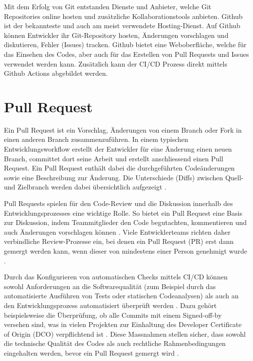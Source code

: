 Mit dem Erfolg von Git entstanden Dienste und Anbieter, welche Git Repositories online hosten und zusätzliche Kollaborationstools anbieten. Github ist der bekannteste und auch am meist verwendete Hosting-Dienst. Auf Github können Entwickler ihr Git-Repository hosten, Änderungen vorschlagen und diskutieren, Fehler (Issues) tracken. Github bietet eine Weboberfläche, welche für das Einsehen des Codes, aber auch für das Erstellen von Pull Requests und Issues verwendet werden kann. Zusätzlich kann der CI/CD Prozess direkt mittels Github Actions abgebildet werden. \parencite{noauthor_informationen_2025}  

\section{Pull Request} 
Ein Pull Request ist ein Vorschlag, Änderungen von einem Branch oder Fork in einen anderen Branch zusammenzuführen. In einem typischen Entwicklungsworkflow erstellt der Entwickler für eine Änderung einen neuen Branch, committet dort seine Arbeit und erstellt anschliessend einen Pull Request. Ein Pull Request enthält dabei die durchgeführten Codeänderungen sowie eine Beschreibung zur Änderung. Die Unterschiede (Diffs) zwischen Quell- und Zielbranch werden dabei übersichtlich aufgezeigt \parencite{noauthor_about_nodate}.

Pull Requests spielen für den Code-Review und die Diskussion innerhalb des Entwicklungsprozesses eine wichtige Rolle. So bietet ein Pull Request eine Basis zur Diskussion, indem Teammitglieder den Code begutachten, kommentieren und auch Änderungen vorschlagen können \parencite{atlassian_pull_nodate}. Viele Entwicklerteams richten daher verbindliche Review-Prozesse ein, bei denen ein Pull Request (PR) erst dann gemergt werden kann, wenn dieser von mindestens einer Person genehmigt wurde \parencite{jiang_how_2022}.

Durch das Konfigurieren von automatischen Checks mittels CI/CD können sowohl Anforderungen an die Softwarequalität (zum Beispiel durch das automatisierte Ausführen von Tests oder statischen Codeanalysen) als auch an den Entwicklungsprozess automatisiert überprüft werden \parencite{kinsman_how_2021}. Dazu gehört beispielsweise die Überprüfung, ob alle Commits mit einem Signed-off-by versehen sind, was in vielen Projekten zur Einhaltung des Developer Certificate of Origin (DCO) verpflichtend ist \parencite{holtgrave_attributing_2025}. Diese Massnahmen stellen sicher, dass sowohl die technische Qualität des Codes als auch rechtliche Rahmenbedingungen eingehalten werden, bevor ein Pull Request gemergt wird \parencite{noauthor_about_nodate}. 

